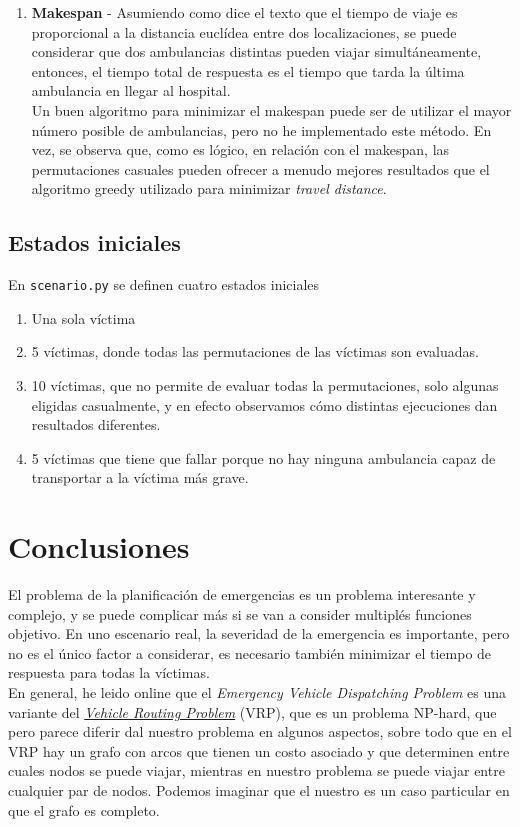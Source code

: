 \begin{enumerate}
   \item \textbf{Makespan} - Asumiendo como dice el texto que el tiempo de viaje es proporcional a la distancia euclídea entre dos localizaciones, se puede considerar que dos ambulancias distintas pueden viajar simultáneamente, entonces, el tiempo total de respuesta es el tiempo que tarda la última ambulancia en llegar al hospital.\\
   Un buen algoritmo para minimizar el makespan puede ser de utilizar el mayor número posible de ambulancias, pero no he implementado este método. En vez, se observa que, como es lógico, en relación con el makespan, las permutaciones casuales pueden ofrecer a menudo mejores resultados que el algoritmo greedy utilizado para minimizar \textit{travel distance}.
\end{enumerate}

\subsection{Estados iniciales}

En \texttt{scenario.py} se definen cuatro estados iniciales
\begin{enumerate}
   \item Una sola víctima
   \item 5 víctimas, donde todas las permutaciones de las víctimas son evaluadas.
   \item 10 víctimas, que no permite de evaluar todas la permutaciones, solo algunas eligidas casualmente, y en efecto observamos cómo distintas ejecuciones dan resultados diferentes.
   \item 5 víctimas que tiene que fallar porque no hay ninguna ambulancia capaz de transportar a la víctima más grave.
\end{enumerate}

\section{Conclusiones}

El problema de la planificación de emergencias es un problema interesante y complejo, y se puede complicar más si se van a consider multiplés funciones objetivo.
En uno escenario real, la severidad de la emergencia es importante, pero no es el único factor a considerar, es necesario también minimizar el tiempo de respuesta para todas la víctimas.\\
En general, he leido online que el \textit{Emergency Vehicle Dispatching Problem} es una variante del \href{https://en.wikipedia.org/wiki/Vehicle_routing_problem}{\textit{Vehicle Routing Problem}} (VRP), que es un problema NP-hard, que pero parece diferir dal nuestro problema en algunos aspectos, sobre todo que en el VRP hay un grafo con arcos que tienen un costo asociado y que determinen entre cuales nodos se puede viajar, mientras en nuestro problema se puede viajar entre cualquier par de nodos. Podemos imaginar que el nuestro es un caso particular en que el grafo es completo.

